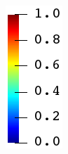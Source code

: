 \begin{figure}[htb!]
\begin{subfigure}[b]{0.065\textwidth}
    \includegraphics[width=\textwidth]{Chapter4/figures/jet_vertical.png}
    \vspace{0.15in}
  \end{subfigure}


\end{figure}
